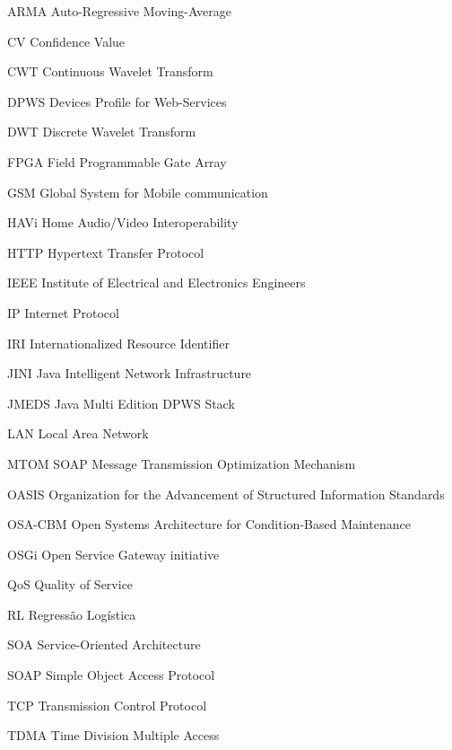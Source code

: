   {ARMA}
  {Auto-Regressive Moving-Average}

  {CV}
  {Confidence Value}

  {CWT}
  {Continuous Wavelet Transform}

  {DPWS}
  {Devices Profile for Web-Services}

  {DWT}
  {Discrete Wavelet Transform}

  {FPGA}
  {Field Programmable Gate Array}

  {GSM}
  {Global System for Mobile communication}

  {HAVi}
  {Home Audio/Video Interoperability}

  {HTTP}
  {Hypertext Transfer Protocol}

  {IEEE}
  {Institute of Electrical and Electronics Engineers}

  {IP}
  {Internet Protocol}

  {IRI}
  {Internationalized Resource Identifier}

  {JINI}
  {Java Intelligent Network Infrastructure}

  {JMEDS}
  {Java Multi Edition DPWS Stack}

  {LAN}
  {Local Area Network}

  {MTOM}
  {SOAP Message Transmission Optimization Mechanism}

  {OASIS}
  {Organization for the Advancement of Structured Information Standards}

  {OSA-CBM}
  {Open Systems Architecture for Condition-Based Maintenance}

  {OSGi}
  {Open Service Gateway initiative}

  {QoS}
  {Quality of Service}

  {RL}
  {Regressão Logística}

  {SOA}
  {Service-Oriented Architecture}

  {SOAP}
  {Simple Object Access Protocol}

  {TCP}
  {Transmission Control Protocol}

  {TDMA}
  {Time Division Multiple Access}

